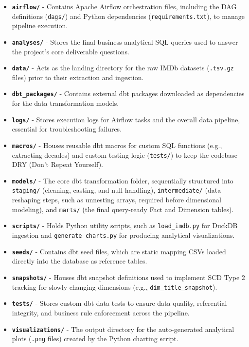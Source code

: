 \documentclass[runningheads]{llncs}
\begin{document}
\begin{itemize}
    \item \textbf{\texttt{airflow/}} - Contains Apache Airflow orchestration files, including the DAG definitions (\texttt{dags/}) and Python dependencies (\texttt{requirements.txt}), to manage pipeline execution.
    \item \textbf{\texttt{analyses/}} - Stores the final business analytical SQL queries used to answer the project's core deliverable questions.
    \item \textbf{\texttt{data/}} - Acts as the landing directory for the raw IMDb datasets (\texttt{.tsv.gz} files) prior to their extraction and ingestion.
    \item \textbf{\texttt{dbt\_packages/}} - Contains external dbt packages downloaded as dependencies for the data transformation models.
    \item \textbf{\texttt{logs/}} - Stores execution logs for Airflow tasks and the overall data pipeline, essential for troubleshooting failures.
    \item \textbf{\texttt{macros/}} - Houses reusable dbt macros for custom SQL functions (e.g., extracting decades) and custom testing logic (\texttt{tests/}) to keep the codebase DRY (Don't Repeat Yourself).
    \item \textbf{\texttt{models/}} - The core dbt transformation folder, sequentially structured into \texttt{staging/} (cleaning, casting, and null handling), \texttt{intermediate/} (data reshaping steps, such as unnesting arrays, required before dimensional modeling), and \texttt{marts/} (the final query-ready Fact and Dimension tables).
    \item \textbf{\texttt{scripts/}} - Holds Python utility scripts, such as \texttt{load\_imdb.py} for DuckDB ingestion and \texttt{generate\_charts.py} for producing analytical visualizations.
    \item \textbf{\texttt{seeds/}} - Contains dbt seed files, which are static mapping CSVs loaded directly into the database as reference tables.
    \item \textbf{\texttt{snapshots/}} - Houses dbt snapshot definitions used to implement SCD Type 2 tracking for slowly changing dimensions (e.g., \texttt{dim\_title\_snapshot}).
    \item \textbf{\texttt{tests/}} - Stores custom dbt data tests to ensure data quality, referential integrity, and business rule enforcement across the pipeline.
    \item \textbf{\texttt{visualizations/}} - The output directory for the auto-generated analytical plots (\texttt{.png} files) created by the Python charting script.

\end{itemize}
\end{document}
